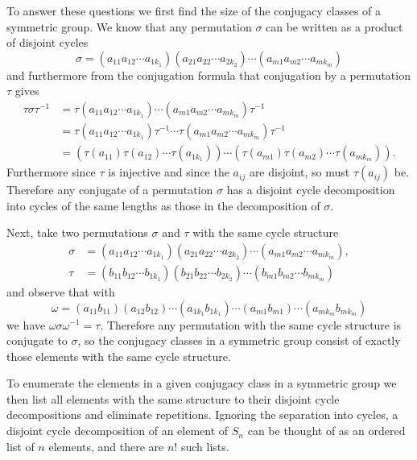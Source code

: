 \documentclass{article}
\begin{document}
\begin{Answer}
To answer these questions we first find the size of the
conjugacy classes of a symmetric group.
We know that any permutation $\sigma$ can be written as a product of
disjoint cycles
$$
\sigma =
  (a_{11} a_{12} \cdots a_{1k_1})
  (a_{21} a_{22} \cdots a_{2k_2})
  \cdots
  (a_{m1} a_{m2} \cdots a_{mk_m})
$$
and furthermore from the conjugation formula that conjugation by a
permutation $\tau$ gives
\begin{align*}
\tau \sigma \tau^{-1} &=
  \tau
  (a_{11} a_{12} \cdots a_{1k_1})
  \cdots
  (a_{m1} a_{m2} \cdots a_{mk_m})
  \tau^{-1} \\
&=
  \tau
  (a_{11} a_{12} \cdots a_{1k_1})
  \tau^{-1}
  \cdots
  \tau
  (a_{m1} a_{m2} \cdots a_{mk_m})
  \tau^{-1} \\
&=
  (\tau(a_{11}) \tau(a_{12}) \cdots \tau(a_{1k_1}))
  \cdots
  (\tau(a_{m1}) \tau(a_{m2}) \cdots \tau(a_{mk_m})).
\end{align*}
Furthermore since $\tau$ is injective and since the $a_{ij}$ are
disjoint, so must $\tau(a_{ij})$ be.
Therefore any conjugate of a permutation $\sigma$ has a disjoint
cycle decomposition into cycles of the same lengths as those in the
decomposition of $\sigma$.

Next, take two permutations $\sigma$ and $\tau$ with the same cycle
structure
\begin{align*}
\sigma &=
  (a_{11} a_{12} \cdots a_{1k_1})
  (a_{21} a_{22} \cdots a_{2k_2})
  \cdots
  (a_{m1} a_{m2} \cdots a_{mk_m}), \\
\tau &=
  (b_{11} b_{12} \cdots b_{1k_1})
  (b_{21} b_{22} \cdots b_{2k_2})
  \cdots
  (b_{m1} b_{m2} \cdots b_{mk_m})
\end{align*}
and observe that with
$$
\omega =
  (a_{11} b_{11})
  (a_{12} b_{12})
  \cdots
  (a_{1k_1} b_{1k_1})
  \cdots
  (a_{m1} b_{m1})
  \cdots
  (a_{mk_m} b_{mk_m})
$$
we have $\omega \sigma \omega^{-1} = \tau$. Therefore any permutation
with the same cycle structure is conjugate to $\sigma$, so the
conjugacy classes in a symmetric group consist of exactly those
elements with the same cycle structure.

To enumerate the elements in a given conjugacy class in a symmetric
group we then list all elements with the same structure to their
disjoint cycle decompositions and eliminate repetitions. Ignoring the
separation into cycles, a disjoint cycle decomposition of an element
of $S_n$ can be thought of as an ordered list of $n$ elements, and
there are $n!$ such lists.


\end{Answer}
\end{document}
